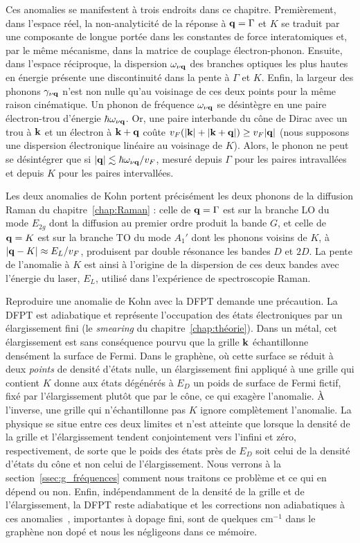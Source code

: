Ces anomalies se manifestent à trois endroits dans ce chapitre. Premièrement, dans l'espace réel, la non-analyticité de la réponse à $\mathbf{q}=\Gamma$ et $K$ se traduit par une composante de longue portée dans les constantes de force interatomiques et, par le même mécanisme, dans la matrice de couplage électron-phonon. Ensuite, dans l'espace réciproque, la dispersion $\omega_{\nu\mathbf{q}}$ des branches optiques les plus hautes en énergie présente une discontinuité dans la pente à $\Gamma$ et $K$. Enfin, la largeur des phonons $\gamma_{\nu\mathbf{q}}$ n'est non nulle qu'au voisinage de ces deux points pour la même raison cinématique. Un phonon de fréquence $\omega_{\nu\mathbf{q}}$ se désintègre en une paire électron-trou d'énergie $\hbar\omega_{\nu\mathbf{q}}$. Or, une paire interbande du cône de Dirac avec un trou à $\mathbf{k}$ et un électron à $\mathbf{k}+\mathbf{q}$ coûte $v_F(|\mathbf{k}|+|\mathbf{k}+\mathbf{q}|)\geq v_F|\mathbf{q}|$ (nous supposons une dispersion électronique linéaire au voisinage de $K$). Alors, le phonon ne peut se désintégrer que si $|\mathbf{q}|\lesssim\hbar\omega_{\nu\mathbf{q}}/v_F$, mesuré depuis $\Gamma$ pour les paires intravallées et depuis $K$ pour les paires intervallées.

Les deux anomalies de Kohn portent précisément les deux phonons de la diffusion Raman du chapitre~\ref{chap:Raman} : celle de $\mathbf{q}=\Gamma$ est sur la branche LO du mode $E_{2g}$ dont la diffusion au premier ordre produit la bande $G$, et celle de $\mathbf{q}=K$ est sur la branche TO du mode $A_1'$ dont les phonons voisins de $K$, à $|\mathbf{q}-K|\approx E_L/v_F$, produisent par double résonance les bandes $D$ et $2D$. La pente de l'anomalie à $K$ est ainsi à l'origine de la dispersion de ces deux bandes avec l'énergie du laser, $E_L$, utilisé dans l'expérience de spectroscopie Raman.

Reproduire une anomalie de Kohn avec la DFPT demande une précaution. La DFPT est adiabatique et représente l'occupation des états électroniques par un élargissement fini (le \textit{smearing} du chapitre~\ref{chap:théorie}). Dans un métal, cet élargissement est sans conséquence pourvu que la grille $\mathbf{k}$ échantillonne densément la surface de Fermi. Dans le graphène, où cette surface se réduit à deux \textit{points} de densité d'états nulle, un élargissement fini appliqué à une grille qui contient $K$ donne aux états dégénérés à $E_D$ un poids de surface de Fermi fictif, fixé par l'élargissement plutôt que par le cône, ce qui exagère l'anomalie. À l'inverse, une grille qui n'échantillonne pas $K$ ignore complètement l'anomalie. La physique se situe entre ces deux limites et n'est atteinte que lorsque la densité de la grille et l'élargissement tendent conjointement vers l'infini et zéro, respectivement, de sorte que le poids des états près de $E_D$ soit celui de la densité d'états du cône et non celui de l'élargissement. Nous verrons à la section~\ref{ssec:g_fréquences} comment nous traitons ce problème et ce qui en dépend ou non. Enfin, indépendamment de la densité de la grille et de l'élargissement, la DFPT reste adiabatique et les corrections non adiabatiques à ces anomalies~\cite{lazzeriNonadiabaticKohnanomalyDoped2006}, importantes à dopage fini, sont de quelques cm$^{-1}$ dans le graphène non dopé et nous les négligeons dans ce mémoire.

